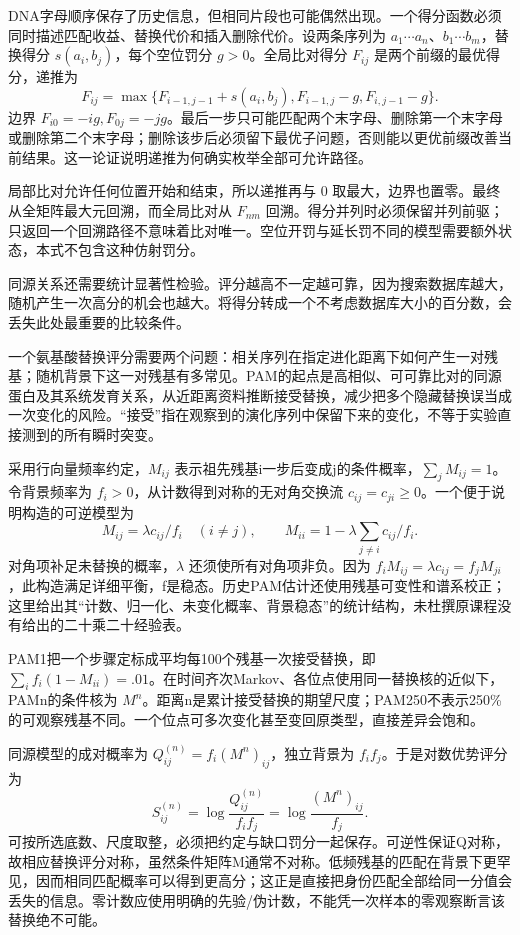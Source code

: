 DNA字母顺序保存了历史信息，但相同片段也可能偶然出现。一个得分函数必须同时描述匹配收益、替换代价和插入删除代价。设两条序列为 $a_1\cdots a_n$、$b_1\cdots b_m$，替换得分 $s(a_i,b_j)$，每个空位罚分 $g>0$。全局比对得分 $F_{ij}$ 是两个前缀的最优得分，递推为
\[
F_{ij}=\max\{F_{i-1,j-1}+s(a_i,b_j),F_{i-1,j}-g,F_{i,j-1}-g\}.
\]
边界 $F_{i0}=-ig,F_{0j}=-jg$。最后一步只可能匹配两个末字母、删除第一个末字母或删除第二个末字母；删除该步后必须留下最优子问题，否则能以更优前缀改善当前结果。这一论证说明递推为何确实枚举全部可允许路径。

局部比对允许任何位置开始和结束，所以递推再与 $0$ 取最大，边界也置零。最终从全矩阵最大元回溯，而全局比对从 $F_{nm}$ 回溯。得分并列时必须保留并列前驱；只返回一个回溯路径不意味着比对唯一。空位开罚与延长罚不同的模型需要额外状态，本式不包含这种仿射罚分。

同源关系还需要统计显著性检验。评分越高不一定越可靠，因为搜索数据库越大，随机产生一次高分的机会也越大。将得分转成一个不考虑数据库大小的百分数，会丢失此处最重要的比较条件。


一个氨基酸替换评分需要两个问题：相关序列在指定进化距离下如何产生一对残基；随机背景下这一对残基有多常见。PAM的起点是高相似、可可靠比对的同源蛋白及其系统发育关系，从近距离资料推断接受替换，减少把多个隐藏替换误当成一次变化的风险。“接受”指在观察到的演化序列中保留下来的变化，不等于实验直接测到的所有瞬时突变。

采用行向量频率约定，$M_{ij}$ 表示祖先残基i一步后变成j的条件概率，$\sum_jM_{ij}=1$。令背景频率为 $f_i>0$，从计数得到对称的无对角交换流 $c_{ij}=c_{ji}\ge0$。一个便于说明构造的可逆模型为
\[
 M_{ij}=\lambda c_{ij}/f_i\quad(i\ne j),\qquad
 M_{ii}=1-\lambda\sum_{j\ne i}c_{ij}/f_i.
\]
对角项补足未替换的概率，$\lambda$ 还须使所有对角项非负。因为 $f_iM_{ij}=\lambda c_{ij}=f_jM_{ji}$，此构造满足详细平衡，f是稳态。历史PAM估计还使用残基可变性和谱系校正；这里给出其“计数、归一化、未变化概率、背景稳态”的统计结构，未杜撰原课程没有给出的二十乘二十经验表。

PAM1把一个步骤定标成平均每100个残基一次接受替换，即 $\sum_i f_i(1-M_{ii})=.01$。在时间齐次Markov、各位点使用同一替换核的近似下，PAMn的条件核为 $M^n$。距离n是累计接受替换的期望尺度；PAM250不表示250\%的可观察残基不同。一个位点可多次变化甚至变回原类型，直接差异会饱和。

同源模型的成对概率为 $Q_{ij}^{(n)}=f_i(M^n)_{ij}$，独立背景为 $f_if_j$。于是对数优势评分为
\[
 S_{ij}^{(n)}=\log\frac{Q_{ij}^{(n)}}{f_if_j}
              =\log\frac{(M^n)_{ij}}{f_j}.
\]
可按所选底数、尺度取整，必须把约定与缺口罚分一起保存。可逆性保证Q对称，故相应替换评分对称，虽然条件矩阵M通常不对称。低频残基的匹配在背景下更罕见，因而相同匹配概率可以得到更高分；这正是直接把身份匹配全部给同一分值会丢失的信息。零计数应使用明确的先验/伪计数，不能凭一次样本的零观察断言该替换绝不可能。

